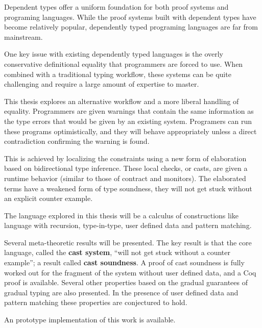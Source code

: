 Dependent types offer a uniform foundation for both proof systems and programing languages.
While the proof systems built with dependent types have become relatively popular, dependently typed programing languages are far from mainstream. 

One key issue with existing dependently typed languages is the overly conservative definitional equality that programmers are forced to use.
When combined with a traditional typing workflow, these systems can be quite challenging and require a large amount of expertise to master.

This thesis explores an alternative workflow and a more liberal handling of equality.
Programmers are given warnings that contain the same information as the type errors that would be given by an existing system.
Programers can run these programs optimistically, and they will behave appropriately unless a direct contradiction confirming the warning is found.

This is achieved by localizing the constraints using a new form of elaboration based on bidirectional type inference.
These local checks, or casts, are given a runtime behavior (similar to those of contract and monitors).
The elaborated terms have a weakened form of type soundness, they will not get stuck without an explicit counter example.

The language explored in this thesis will be a calculus of constructions like language with recursion, type-in-type, user defined data and pattern matching. 

Several meta-theoretic results will be presented.
The key result is that the core language, called the \textbf{cast system}, ``will not get stuck without a counter example''; a result called \textbf{cast soundness}.
A proof of cast soundness is fully worked out for the fragment of the system without user defined data, and a Coq proof is available. Several other properties based on the gradual guarantees of gradual typing are also presented.
In the presence of user defined data and pattern matching these properties are conjectured to hold.

An prototype implementation of this work is available.

